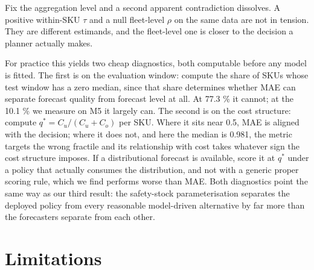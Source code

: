 \documentclass[11pt]{article}
\begin{document}
Fix the aggregation level and a second apparent contradiction dissolves. A
positive within-SKU $\tau$ and a null fleet-level $\rho$ on the same data are
not in tension. They are different estimands, and the fleet-level one is closer
to the decision a planner actually makes.

For practice this yields two cheap diagnostics, both computable before any
model is fitted. The first is on the evaluation window: compute the share of
SKUs whose test window has a zero median, since that share determines whether
MAE can separate forecast quality from forecast level at all. At 77.3 \% it
cannot; at the 10.1 \% we measure on M5 it largely can. The second is on the
cost structure: compute $q^\ast = C_u/(C_u+C_o)$ per SKU. Where it sits near
0.5, MAE is aligned with the decision; where it does not, and here the median
is 0.981, the metric targets the wrong fractile and its relationship with cost
takes whatever sign the cost structure imposes. If a distributional forecast is
available, score it at $q^\ast$ under a policy that actually consumes the
distribution, and not with a generic proper scoring rule, which we find
performs worse than MAE. Both diagnostics point the same way as our third
result: the safety-stock parameterisation separates the deployed policy from
every reasonable model-driven alternative by far more than the forecasters
separate from each other.

\section{Limitations}
\end{document}
